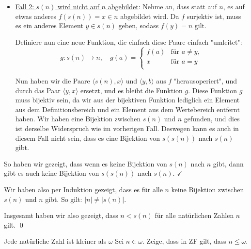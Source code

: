 \documentclass[12pt]{article}
\begin{document}
\begin{itemize}
\begin{itemize}
        Da $f$ eine Bijektion ist, und wir lediglich ein Element jeweils aus dem Definition- und Wertebereich entfernt haben, bleibt $g$ eine Bijektion. Dies widerspricht aber unserer Annahme, dass es keine solche Bijektion gibt. Somit war unsere Annahme falsch, dass es eine Bijektion von $s(s(n))$ nach $s(n)$ gibt.

        \item \underline{Fall 2: $s(n)$ wird nicht auf $n$ abgebildet}: Nehme an, dass statt auf $n$, es auf etwas anderes $f(s(n)) = x \in n$ abgebildet wird. Da $f$ surjektiv ist, muss es ein anderes Element $y \in s(n)$ geben, sodass $f(y) = n$ gilt.
        
        Definiere nun eine neue Funktion, die einfach diese Paare einfach "umleitet":
        $$
            g: s(n) \rightarrow n,\quad g(a) = \begin{cases}
                f(a) & \text{für } a \neq y, \\
                x & \text{für } a = y \\
            \end{cases}
        $$

        Nun haben wir die Paare $\langle s(n), x \rangle$ und $\langle y, b \rangle$ aus $f$ "herausoperiert", und durch das Paar $\langle y, x \rangle$ ersetzt, und es bleibt die Funktion $g$. Diese Funktion $g$ muss bijektiv sein, da wir aus der bijektiven Funktion lediglich ein Element aus dem Definitionsbereich und ein Element aus dem Wertebereich entfernt haben. Wir haben eine Bijektion zwischen $s(n)$ und $n$ gefunden, und dies ist derselbe Widerspruch wie im vorherigen Fall. Deswegen kann es auch in diesem Fall nicht sein, dass es eine Bijektion von $s(s(n))$ nach $s(n)$ gibt.
    \end{itemize}

    So haben wir gezeigt, dass wenn es keine Bijektion von $s(n)$ nach $n$ gibt, dann gibt es auch keine Bijektion von $s(s(n))$ nach $s(n)$. $\checkmark$
\end{itemize}

Wir haben also per Induktion gezeigt, dass es für alle $n$ keine Bijektion zwischen $s(n)$ und $n$ gibt. So gilt: $|n| \neq |s(n)|$.

Insgesamt haben wir also gezeigt, dass $n < s(n)$ für alle natürlichen Zahlen $n$ gilt. \qed

\begin{problem}[Aufgabe]{Jede natürliche Zahl ist kleiner als $\omega$}{}
    Sei $n \in \omega$. Zeige, dass in ZF gilt, dass $n \leq \omega$.
\end{problem}
\end{document}
